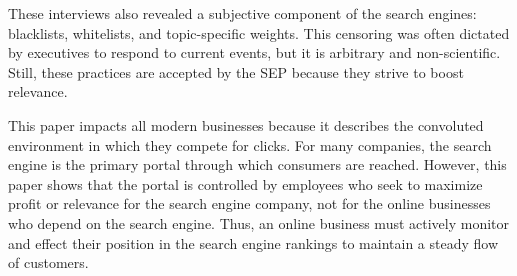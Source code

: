 \documentclass[../summaries.tex]{subfiles}
\begin{document}
These interviews also revealed a subjective component of the search engines: blacklists, whitelists, and topic-specific weights. This censoring was often dictated by executives to respond to current events, but it is arbitrary and non-scientific. Still, these practices are accepted by the SEP because they strive to boost relevance.

This paper impacts all modern businesses because it describes the convoluted environment in which they compete for clicks. For many companies, the search engine is the primary portal through which consumers are reached. However, this paper shows that the portal is controlled by employees who seek to maximize profit or relevance for the search engine company, not for the online businesses who depend on the search engine. Thus, an online business must actively monitor and effect their position in the search engine rankings to maintain a steady flow of customers.
\end{document}
